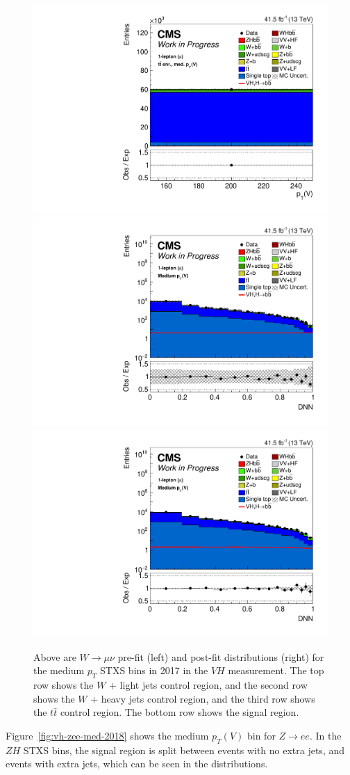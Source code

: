 \begin{figure}
  \includegraphics[width=0.35\linewidth]{figures/210322_STXSfine_400split_unblinded_Xbb_025349b6_postfitplots/plot_shapes_vhbb_Wmn_8_13TeV2017_postfit.pdf} \\
  \includegraphics[width=0.35\linewidth]{figures/210322_STXSfine_400split_unblinded_Xbb_025349b6_postfitplots/plot_shapes_vhbb_Wmn_5_13TeV2017_prefit_logy.pdf}
  \includegraphics[width=0.35\linewidth]{figures/210322_STXSfine_400split_unblinded_Xbb_025349b6_postfitplots/plot_shapes_vhbb_Wmn_5_13TeV2017_postfit_logy.pdf} \\
  \caption[$W\rightarrow \mu\nu$ $V\!H$ distributions for medium $p_T$ in 2017]{
    Above are $W\rightarrow \mu\nu$ pre-fit (left) and post-fit distributions (right)
    for the medium $p_T$ STXS bins in 2017 in the $V\!H$ measurement.
    The top row shows the $W$ + light jets control region, and
    the second row shows the $W$ + heavy jets control region, and
    the third row shows the $t\bar{t}$ control region.
    The bottom row shows the signal region.
  }
  \label{fig:vh-wmn-med-2017}
\end{figure}
%
Figure~\ref{fig:vh-zee-med-2018} shows the medium $p_T(V)$ bin for $Z\rightarrow ee$.
In the $Z\!H$ STXS bins, the signal region is split between events with no extra jets,
and events with extra jets, which can be seen in the distributions.
%
